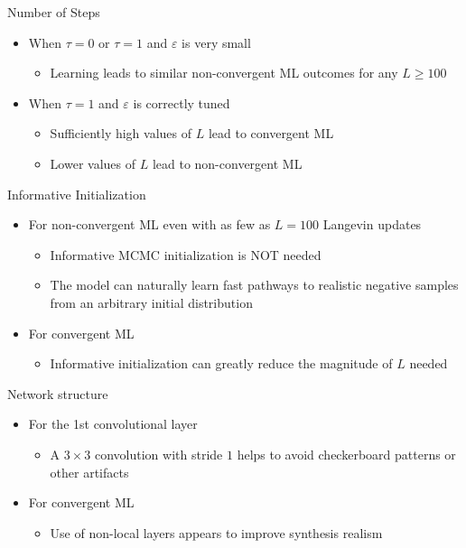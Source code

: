 \documentclass{beamer}
\begin{document}
\begin{frame}{Number of Steps}
\begin{itemize}
\item When $\tau=0$ or $\tau=1$ and $\varepsilon$ is very small
\begin{itemize}
\item Learning leads to similar non-convergent ML outcomes for any $L\geq100$
\end{itemize}
\item When $\tau=1$ and $\varepsilon$ is correctly tuned
\begin{itemize}
\item Sufficiently high values of $L$ lead to convergent ML
\item Lower values of $L$ lead to non-convergent ML
\end{itemize}
\end{itemize}
\end{frame}

\begin{frame}{Informative Initialization}
\begin{itemize}
\item For non-convergent ML even with as few as $L=100$ Langevin updates
\begin{itemize}
\item Informative MCMC initialization is NOT needed
\item The model can naturally learn fast pathways to realistic negative samples from an arbitrary initial distribution
\end{itemize}
\item For convergent ML
\begin{itemize}
\item Informative initialization can greatly reduce the magnitude of $L$ needed
\end{itemize}
\end{itemize}
\end{frame}

\begin{frame}{Network structure}
\begin{itemize}
\item For the 1st convolutional layer
\begin{itemize}
\item A $3\times3$ convolution with stride $1$ helps to avoid checkerboard patterns or other artifacts
\end{itemize}
\item For convergent ML
\begin{itemize}
\item Use of non-local layers appears to improve synthesis realism
\end{itemize}
\end{itemize}
\end{frame}
\end{document}
